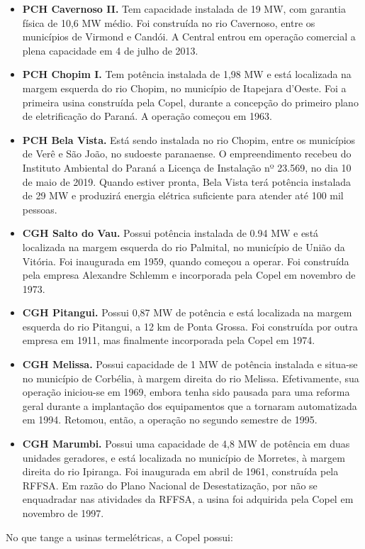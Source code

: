 \documentclass[grad,numbers]{coppe}
\begin{document}
\begin{itemize}
  \item
    \textbf{PCH Cavernoso II.} Tem capacidade instalada de 19 MW, com garantia física de 10,6 MW médio. Foi construída no rio Cavernoso, entre os municípios de Virmond e Candói. A Central entrou em operação comercial a plena capacidade em 4 de julho de 2013.
  \item
    \textbf{PCH Chopim I.} Tem potência instalada de 1,98 MW e está localizada na margem esquerda do rio Chopim, no município de Itapejara d'Oeste. Foi a primeira usina construída pela Copel, durante a concepção do primeiro plano de eletrificação do Paraná. A operação começou em 1963.
  \item
    \textbf{PCH Bela Vista.} Está sendo instalada no rio Chopim, entre os municípios de Verê e São João, no sudoeste paranaense. O empreendimento recebeu do Instituto Ambiental do Paraná a Licença de Instalação nº 23.569, no dia 10 de maio de 2019. Quando estiver pronta, Bela Vista terá potência instalada de 29 MW e produzirá energia elétrica suficiente para atender até 100 mil pessoas.
  \item
    \textbf{CGH Salto do Vau.} Possui potência instalada de 0.94 MW e está localizada na margem esquerda do rio Palmital, no município de União da Vitória. Foi inaugurada em 1959, quando começou a operar. Foi construída pela empresa Alexandre Schlemm e incorporada pela Copel em novembro de 1973.
  \item
    \textbf{CGH Pitangui.} Possui 0,87 MW de potência e está localizada na margem esquerda do rio Pitangui, a 12 km de Ponta Grossa. Foi construída por outra empresa em 1911, mas finalmente incorporada pela Copel em 1974.
  \item
    \textbf{CGH Melissa.} Possui capacidade de 1 MW de potência instalada e situa-se no município de Corbélia, à margem direita do rio Melissa. Efetivamente, sua operação iniciou-se em 1969, embora tenha sido pausada para uma reforma geral durante a implantação dos equipamentos que a tornaram automatizada em 1994. Retomou, então, a operação no segundo semestre de 1995.
  \item
    \textbf{CGH Marumbi.} Possui uma capacidade de 4,8 MW de potência em duas unidades geradores, e está localizada no município de Morretes, à margem direita do rio Ipiranga. Foi inaugurada em abril de 1961, construída pela RFFSA. Em razão do Plano Nacional de Desestatização, por não se enquadradar nas atividades da RFFSA, a usina foi adquirida pela Copel em novembro de 1997.
  \end{itemize}
  No que tange a usinas termelétricas, a Copel possui:
\end{document}

